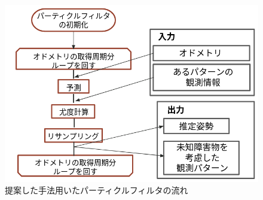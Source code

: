 \begin{figure}[h]
  \begin{center}
    \includegraphics[width=1.2\linewidth]{figs/particle_filter_flow_improve.png}
    \caption{提案した手法用いたパーティクルフィルタの流れ}
    \label{fig:particle_filter_flow_improve}
  \end{center}
\end{figure}
